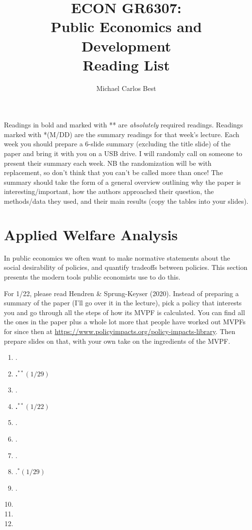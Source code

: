 \documentclass[11pt]{article}
\begin{document}
\title{ECON GR6307: \\ Public Economics and Development \\ Reading List}
\author{Michael Carlos Best}

\maketitle

Readings in bold and marked with ** are \textit{absolutely} required readings. Readings marked with *(M/DD) are the summary readings for that week's lecture. Each week you should prepare a 6-slide summary (excluding the title slide) of the paper and bring it with you on a USB drive. I will randomly call on someone to present their summary each week. NB the randomization will be with replacement, so don't think that you can't be called more than once! The summary should take the form of a general overview outlining why the paper is interesting/important, how the authors approached their question, the methods/data they used, and their main results (copy the tables into your slides).

\section{Applied Welfare Analysis}

In public economics we often want to make normative statements about the social desirability of policies, and quantify tradeoffs between policies. This section presents the modern tools public economists use to do this. 

For 1/22, please read Hendren \& Sprung-Keyser (2020). Instead of preparing a summary of the paper (I'll go over it in the lecture), pick a policy that interests you and go through all the steps of how its MVPF is calculated. You can find all the ones in the paper plus a whole lot more that people have worked out MVPFs for since then at \url{https://www.policyimpacts.org/policy-impacts-library}. Then prepare slides on that, with your own take on the ingredients of the MVPF.

\begin{enumerate}
\item {}.
\item \textbf{.$^{**}(1/29)$}
\item {}.
\item \textbf{.$^{**}(1/22)$}
\item {}.
\item {}.
\item {}.
\item {}.$^{*}(1/29)$
\item {}.
\item {}
\item {}
\item {}
\end{enumerate}
\end{document}
